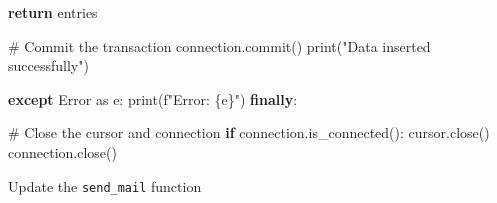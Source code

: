 \documentclass[
  letterpaper,
  DIV=11,
  numbers=noendperiod]{scrreprt}
\newenvironment{Shaded}{\begin{snugshade}}{\end{snugshade}}
\newcommand{\BuiltInTok}[1]{\textcolor[rgb]{0.00,0.23,0.31}{#1}}
\newcommand{\CommentTok}[1]{\textcolor[rgb]{0.37,0.37,0.37}{#1}}
\newcommand{\ControlFlowTok}[1]{\textcolor[rgb]{0.00,0.23,0.31}{\textbf{#1}}}
\newcommand{\ImportTok}[1]{\textcolor[rgb]{0.00,0.46,0.62}{#1}}
\newcommand{\NormalTok}[1]{\textcolor[rgb]{0.00,0.23,0.31}{#1}}
\newcommand{\SpecialCharTok}[1]{\textcolor[rgb]{0.37,0.37,0.37}{#1}}
\newcommand{\SpecialStringTok}[1]{\textcolor[rgb]{0.13,0.47,0.30}{#1}}
\newcommand{\StringTok}[1]{\textcolor[rgb]{0.13,0.47,0.30}{#1}}
\begin{document}
\begin{Shaded}
\begin{Highlighting}[]
                \ControlFlowTok{return}\NormalTok{ entries}

                \CommentTok{\# Commit the transaction}
\NormalTok{                connection.commit()}
                \BuiltInTok{print}\NormalTok{(}\StringTok{"Data inserted successfully"}\NormalTok{)}

  \ControlFlowTok{except}\NormalTok{ Error }\ImportTok{as}\NormalTok{ e:}
        \BuiltInTok{print}\NormalTok{(}\SpecialStringTok{f"Error: }\SpecialCharTok{\{}\NormalTok{e}\SpecialCharTok{\}}\SpecialStringTok{"}\NormalTok{)}
  \ControlFlowTok{finally}\NormalTok{:}
        
        \CommentTok{\# Close the cursor and connection}
        \ControlFlowTok{if}\NormalTok{ connection.is\_connected():}
\NormalTok{            cursor.close()}
\NormalTok{            connection.close()}
\end{Highlighting}
\end{Shaded}

Update the \texttt{send\_mail} function
\end{document}
